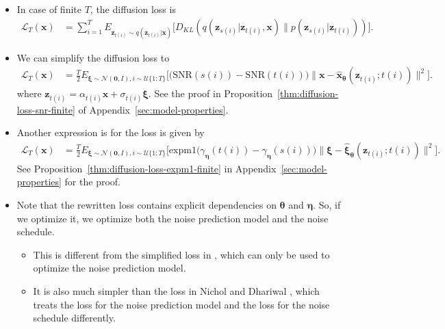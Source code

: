 \documentclass[10pt]{article}
\newcommand{\ve}[1]{\mathbf{#1}}
\newcommand{\ves}[1]{\boldsymbol{#1}}
\newcommand{\mrm}[1]{\mathrm{#1}}
\newcommand{\mcal}[1]{\mathcal{#1}}
\newcommand{\SNR}{\mathrm{SNR}}
\begin{document}
\begin{itemize}
  \item In case of finite $T$, the diffusion loss is
  \begin{align*}
    \mcal{L}_T(\ve{x})
    &= \sum_{i=1}^T E_{\ve{z}_{t(i)} \sim q(\ve{z}_{t(i)}|\ve{x})} \big[
    D_{KL}
    (
      q( \ve{z}_{s(i)} | \ve{z}_{t(i)}, \ve{x} ) 
      \| 
      p(\ve{z}_{s(i)} | \ve{z}_{t(i)})
    )
    \big].
  \end{align*}

  \item We can simplify the diffusion loss to
  \begin{align*}
    \mcal{L}_T(\ve{x})
    &= \frac{T}{2} E_{\ves{\xi} \sim \mcal{N}(\ves{0},I), i \sim \mcal{U}\{1:T\}} \Big[ \big(\SNR(s(i)) - \SNR(t(i))\big) \| \ve{x} - \hat{\ve{x}}_{\ves{\theta}}(\ve{z}_{t(i)}; t(i)) \|^2 \Big].
  \end{align*}
  where $\ve{z}_{t(i)} = \alpha_{t(i)} \ve{x} + \sigma_{t(i)}\ves{\xi}$. See the proof in Proposition~\ref{thm:diffusion-loss-snr-finite} of Appendix~\ref{sec:model-properties}. 
  
  \item Another expression is for the loss is given by
  \begin{align*}
    \mcal{L}_T(\ve{x})
    &= \frac{T}{2} 
    E_{\ves{\xi} \sim \mcal{N}(\ves{0},I), i \sim \mcal{U}\{1:T\}} \Big[ 
      \mrm{expm1}\big(\gamma_{\ves{\eta}}(t(i)) - \gamma_{\ves{\eta}}(s(i)) \big) \| \ve{\xi} - \hat{\ve{\xi}}_{\ves{\theta}}(\ve{z}_{t(i)}; t(i)) \|^2 \Big].
  \end{align*}
  See Proposition~\ref{thm:diffusion-loss-expm1-finite} in Appendix~\ref{sec:model-properties} for the proof.

  \item Note that the rewritten loss contains explicit dependencies on $\ves{\theta}$ and $\ves{\eta}$. So, if we optimize it, we optimize both the noise prediction model and the noise schedule.
  \begin{itemize}
    \item This is different from the simplified loss in \cite{Ho:2020}, which can only be used to optimize the noise prediction model.
    
    \item It is also much simpler than the loss in Nichol and Dhariwal \cite{Nichol:2021}, which treats the loss for the noise prediction model and the loss for the noise schedule differently.
  \end{itemize}


\end{itemize}
\end{document}
